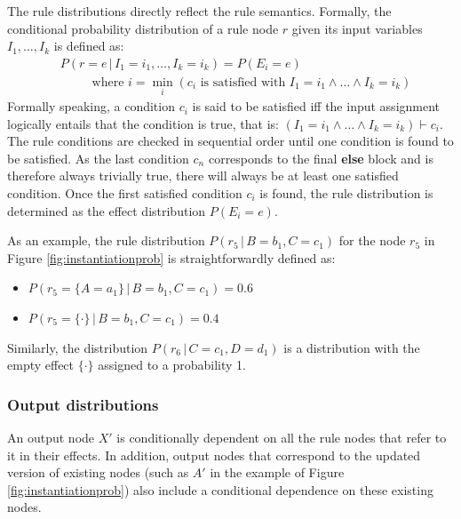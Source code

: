 The rule distributions directly reflect the rule semantics.  Formally, the conditional probability distribution of a rule node $r$ given its input variables $I_1, \dots, I_k$ is defined as: 
\begin{align}
& P(r\!=\!e \, | \, I_1\!=\!i_1, \dots, I_k\!=\!i_k) = P(E_i = e) \label{eq:ruledistrib}
 \\ 
& \; \; \; \; \; \; \; \; \text{ where } i = \min_i (c_i \text{ is satisfied with } I_1\!=\!i_1 \land \dots \land I_k\!=\!i_k) \nonumber 
\end{align}
Formally speaking, a condition $c_i$ is said to be satisfied iff the input assignment logically entails that the condition is true, that is: $(I_1\!=\!i_1 \land \dots \land I_k\!=\!i_k) \vdash c_i$. The rule conditions are checked in sequential order until one condition is found to be satisfied. As the last condition $c_n$ corresponds to the final \textbf{else} block and is therefore always trivially true, there will always be at least one satisfied condition. Once the first satisfied condition $c_i$ is found, the rule distribution is determined as the effect distribution $P(E_i\!=\!e)$.

As an example, the rule distribution $P(r_5 \, | \, B\!=\!b_1, C\!=\!c_1)$ for the node $r_5$ in Figure \ref{fig:instantiationprob} is straightforwardly defined as:
\begin{itemize}
\item $P(r_5 = \{A\!=\!a_1\} \, | \, B\!=\!b_1, C\!=\!c_1) = 0.6$
\item  $P(r_5 = \{\cdot\} \, | \, B\!=\!b_1, C\!=\!c_1) = 0.4$
\end{itemize}

Similarly, the distribution $P(r_6 \, | \, C\!=\!c_1, D\!=\!d_1)$ is a distribution with the empty effect $\{\cdot\}$ assigned to a probability 1. 

\subsubsection*{Output distributions} 

An output node $X'$ is conditionally dependent on all the rule nodes that refer to it in their effects.  In addition, output nodes that correspond to the updated version of existing nodes (such as $A'$ in the example of Figure \ref{fig:instantiationprob}) also include a conditional dependence on these existing nodes.

